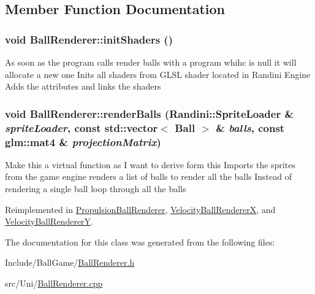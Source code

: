 \subsection{Member Function Documentation}
\hypertarget{classBallRenderer_a6340a67dc1f573c71ea9934f35560256}{
\subsubsection[{initShaders}]{\setlength{\rightskip}{0pt plus 5cm}void BallRenderer::initShaders ()}}
\label{classBallRenderer_a6340a67dc1f573c71ea9934f35560256}
As soon as the program calls render balls with a program whihc is null it will allocate a new one Inits all shaders from GLSL shader located in Randini Engine Adds the attributes and links the shaders \hypertarget{classBallRenderer_a6169ba2a00e8d15fde87a3ee4552cf66}{
\subsubsection[{renderBalls}]{\setlength{\rightskip}{0pt plus 5cm}void BallRenderer::renderBalls ({\bf Randini::SpriteLoader} \& {\em spriteLoader}, \/  const std::vector$<$ {\bf Ball} $>$ \& {\em balls}, \/  const glm::mat4 \& {\em projectionMatrix})}}
\label{classBallRenderer_a6169ba2a00e8d15fde87a3ee4552cf66}
Make this a virtual function as I want to derive form this Imports the sprites from the game engine renders a list of balls to render all the balls Instead of rendering a single ball loop through all the balls 

Reimplemented in \hyperlink{classPropulsionBallRenderer_a9ebdecb973a1a399b4699d7e5c47c0b9}{PropulsionBallRenderer}, \hyperlink{classVelocityBallRendererX_ad0ef24ce7ba5116231f4a47aff280f12}{VelocityBallRendererX}, and \hyperlink{classVelocityBallRendererY_aee5499c81382f071f58467d2040e36c9}{VelocityBallRendererY}.

The documentation for this class was generated from the following files:\begin{DoxyCompactItemize}
\item 
Include/BallGame/\hyperlink{BallRenderer_8h}{BallRenderer.h}\item 
src/Uni/\hyperlink{BallRenderer_8cpp}{BallRenderer.cpp}\end{DoxyCompactItemize}
